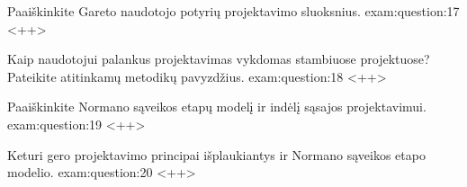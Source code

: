 \begin{question}{%
  Paaiškinkite Gareto naudotojo potyrių projektavimo sluoksnius.
  }{exam:question:17}
  <++>
\end{question}

\begin{question}{%
  Kaip naudotojui palankus projektavimas vykdomas stambiuose projektuose?
  Pateikite atitinkamų metodikų pavyzdžius.
  }{exam:question:18}
  <++>
\end{question}

\begin{question}{%
  Paaiškinkite Normano sąveikos etapų modelį ir indėlį sąsajos
  projektavimui.
  }{exam:question:19}
  <++>
\end{question}

\begin{question}{%
  Keturi gero projektavimo principai išplaukiantys ir Normano sąveikos
  etapo modelio.
  }{exam:question:20}
  <++>
\end{question}
